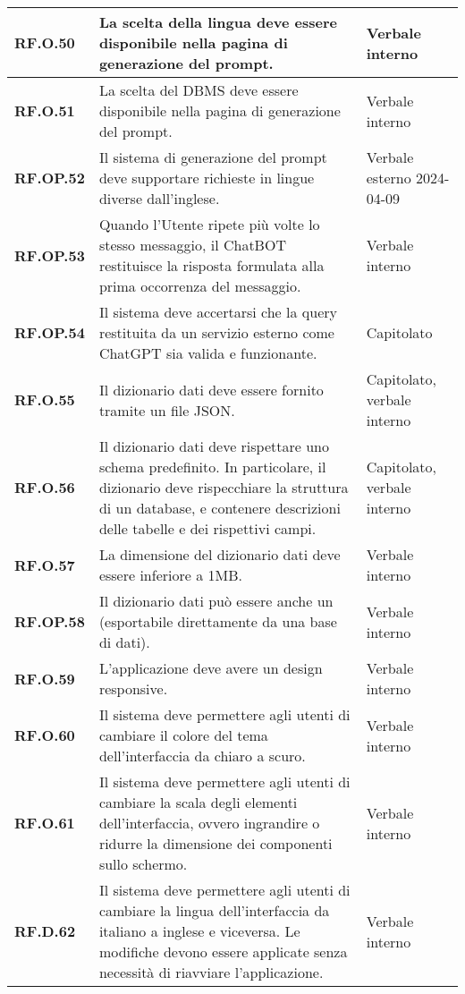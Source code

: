 \begin{adjustwidth}{-0.5cm}{-0.5cm}
\begin{longtable}{|P{3cm}|P{6,5cm}|>{\arraybackslash}P{4cm}|}
    \textbf{RF.O.50} & La scelta della lingua deve essere disponibile nella pagina di generazione del prompt. & Verbale interno \\
    \hline
    \textbf{RF.O.51} & La scelta del DBMS deve essere disponibile nella pagina di generazione del prompt. & Verbale interno \\
    \hline
    \textbf{RF.OP.52} & Il sistema di generazione del prompt deve supportare richieste in lingue diverse dall'inglese. & Verbale esterno 2024-04-09 \\
    \hline
    \textbf{RF.OP.53} & Quando l'Utente ripete più volte lo stesso messaggio, il ChatBOT restituisce la risposta formulata alla prima occorrenza del messaggio. & Verbale interno \\
    \hline
    \textbf{RF.OP.54} & Il sistema deve accertarsi che la query  restituita da un servizio esterno come ChatGPT sia valida e funzionante. & Capitolato \\
    \hline
    \textbf{RF.O.55} & Il dizionario dati deve essere fornito tramite un file JSON. & Capitolato, verbale interno \\
    \hline
    \textbf{RF.O.56} & Il dizionario dati deve rispettare uno schema predefinito. In particolare, il dizionario deve rispecchiare la struttura di un database, e contenere descrizioni delle tabelle e dei rispettivi campi. & Capitolato, verbale interno \\
    \hline
    \textbf{RF.O.57} & La dimensione del dizionario dati deve essere inferiore a 1MB. & Verbale interno \\
    \hline
    \textbf{RF.OP.58} & Il dizionario dati può essere anche un  (esportabile direttamente da una base di dati). & Verbale interno \\
    \hline
    \textbf{RF.O.59} & L'applicazione deve avere un design responsive. & Verbale interno \\
    \hline
    \textbf{RF.O.60} & Il sistema deve permettere agli utenti di cambiare il colore del tema dell'interfaccia da chiaro a scuro. & Verbale interno \\
    \hline
    \textbf{RF.O.61} & Il sistema deve permettere agli utenti di cambiare la scala degli elementi dell'interfaccia, ovvero ingrandire o ridurre la dimensione dei componenti sullo schermo. & Verbale interno \\
    \hline
    \textbf{RF.D.62} & Il sistema deve permettere agli utenti di cambiare la lingua dell'interfaccia da italiano a inglese e viceversa. Le modifiche devono essere applicate senza necessità di riavviare l'applicazione. & Verbale interno \\
  \end{longtable}
\end{adjustwidth}
\egroup

